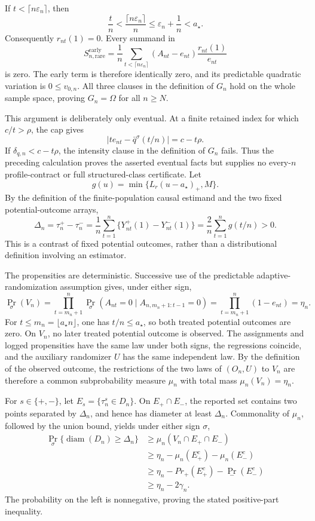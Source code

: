 If \(t<\lceil n\varepsilon_n\rceil\), then
\[
 \frac tn<\frac{\lceil n\varepsilon_n\rceil}{n}
 \le \varepsilon_n+\frac1n<a_\star.
\]
Consequently \(r_{nt}(1)=0\).  Every summand in
\[
 S_{n,\mathrm{rare}}^{\mathrm{early}}
 =\frac1n\sum_{t<\lceil n\varepsilon_n\rceil}
 (A_{nt}-e_{nt})\frac{r_{nt}(1)}{e_{nt}}
\]
is zero.  The early term is therefore identically zero, and its predictable quadratic variation is \(0\le v_{0,n}\).  All three clauses in the definition of \(G_n\) hold on the whole sample space, proving \(G_n=\Omega\) for all \(n\ge N\).

This argument is deliberately only eventual.  At a finite retained index for which \(c/t>\rho\), the cap gives
\[
 |t e_{nt}-\bar q^\sigma(t/n)|=c-t\rho.
\]
If \(\delta_{q,n}<c-t\rho\), the intensity clause in the definition of \(G_n\) fails.  Thus the preceding calculation proves the asserted eventual facts but supplies no every-\(n\) profile-contract or full structured-class certificate.
Let
\[
 g(u)=\min\{L_r(u-a_\star)_+,M\}.
\]
By the definition of the finite-population causal estimand and the two fixed potential-outcome arrays,
\[
 \Delta_n
 =\tau_n^+-\tau_n^-
 =\frac1n\sum_{t=1}^n\{Y_{nt}^+(1)-Y_{nt}^-(1)\}
 =\frac2n\sum_{t=1}^n g(t/n)>0.
\]
This is a contrast of fixed potential outcomes, rather than a distributional definition involving an estimator.

The propensities are deterministic.  Successive use of the predictable adaptive-randomization assumption gives, under either sign,
\[
 \Pr_\sigma(V_n)
 =\prod_{t=m_n+1}^n
   \Pr_\sigma(A_{nt}=0\mid A_{n,m_n+1:t-1}=0)
 =\prod_{t=m_n+1}^n(1-e_{nt})=\eta_n.
\]
For \(t\le m_n=\lfloor a_\star n\rfloor\), one has \(t/n\le a_\star\), so both treated potential outcomes are zero.  On \(V_n\), no later treated potential outcome is observed.  The assignments and logged propensities have the same law under both signs, the regressions coincide, and the auxiliary randomizer \(U\) has the same independent law.  By the definition of the observed outcome, the restrictions of the two laws of \((O_n,U)\) to \(V_n\) are therefore a common subprobability measure \(\mu_n\) with total mass \(\mu_n(V_n)=\eta_n\).

For \(s\in\{+,-\}\), let \(E_s=\{\tau_n^s\in D_n\}\).  On \(E_+\cap E_-\), the reported set contains two points separated by \(\Delta_n\), and hence has diameter at least \(\Delta_n\).  Commonality of \(\mu_n\), followed by the union bound, yields under either sign \(\sigma\),
\[
\begin{aligned}
 \Pr_\sigma\{\operatorname{diam}(D_n)\ge\Delta_n\}
 &\ge \mu_n(V_n\cap E_+\cap E_-)\\
 &\ge \eta_n-\mu_n(E_+^c)-\mu_n(E_-^c)\\
 &\ge \eta_n-Pr_+(E_+^c)-\Pr_-(E_-^c)\\
 &\ge \eta_n-2\gamma_n.
\end{aligned}
\]
The probability on the left is nonnegative, proving the stated positive-part inequality.

